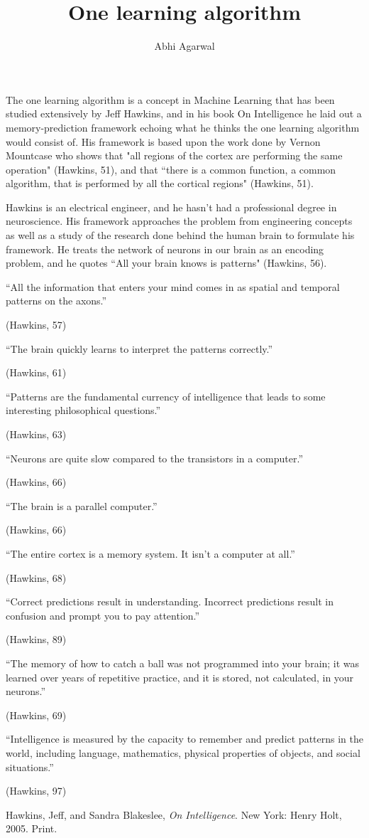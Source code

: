 \documentclass[11pt, oneside]{article}
\title{One learning algorithm}
\author{Abhi Agarwal}
\date{}
\begin{document}
\maketitle

\par The one learning algorithm is a concept in Machine Learning that has been studied extensively by Jeff Hawkins, and in his book On Intelligence he laid out a memory-prediction framework echoing what he thinks the one learning algorithm would consist of. His framework is based upon the work done by Vernon Mountcase who shows that "all regions of the cortex are performing the same operation" (Hawkins, 51), and that ``there is a common function, a common algorithm, that is performed by all the cortical regions" (Hawkins, 51). 

\par Hawkins is an electrical engineer, and he hasn't had a professional degree in neuroscience. His framework approaches the problem from engineering concepts as well as a study of the research done behind the human brain to formulate his framework. He treats the network of neurons in our brain as an encoding problem, and he quotes ``All your brain knows is patterns" (Hawkins, 56).

\epigraph{``All the information that enters your mind comes in as spatial and temporal patterns on the axons.''}{(Hawkins, 57)} 

\epigraph{``The brain quickly learns to interpret the patterns correctly.''}{(Hawkins, 61)} 

\epigraph{``Patterns are the fundamental currency of intelligence that leads to some interesting philosophical questions.''}{(Hawkins, 63)} 

\epigraph{``Neurons are quite slow compared to the transistors in a computer.''}{(Hawkins, 66)} 

\epigraph{``The brain is a parallel computer.''}{(Hawkins, 66)} 

\epigraph{``The entire cortex is a memory system. It isn't a computer at all.''}{(Hawkins, 68)} 

\epigraph{``Correct predictions result in understanding. Incorrect predictions result in confusion and prompt you to pay attention.''}{(Hawkins, 89)} 

\epigraph{``The memory of how to catch a ball was not programmed into your brain; it was learned over years of repetitive practice, and it is stored, not calculated, in your neurons.''}{(Hawkins, 69)} 

\epigraph{``Intelligence is measured by the capacity to remember and predict patterns in the world, including language, mathematics, physical properties of objects, and social situations.''}{(Hawkins, 97)} 


\begin{thebibliography}{9}
  Hawkins, Jeff, and Sandra Blakeslee,
  \emph{On Intelligence}.
  New York: Henry Holt, 2005.
  Print.
\end{thebibliography}
\end{document}
